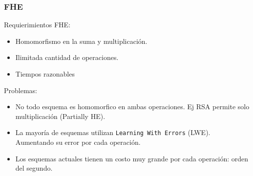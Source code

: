 \documentclass[10pt]{beamer}
\begin{document}





\begin{frame}
\frametitle{FHE}
Requierimientos FHE:
\begin{itemize}
  \item Homomorfismo en la suma y multiplicación.
  \item Ilimitada cantidad de operaciones.
  \item Tiempos razonables
\end{itemize}

Problemas:
\begin{itemize}
  \item No todo esquema es homomorfico en ambas operaciones. Ej RSA permite solo multiplicación (Partially HE).
  \item La mayoría de esquemas utilizan \texttt{Learning With Errors} (LWE). Aumentando su error por cada operación.
  \item Los esquemas actuales tienen un costo muy grande por cada operación: orden del segundo.
\end{itemize}




\end{frame}
\end{document}
